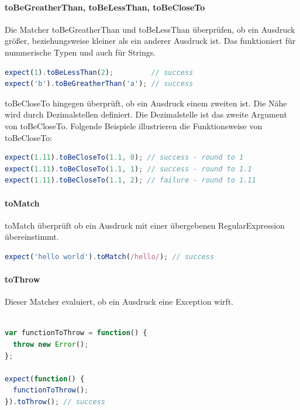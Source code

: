 \paragraph{toBeGreatherThan, toBeLessThan, toBeCloseTo}
Die Matcher toBeGreatherThan und toBeLessThan überprüfen, ob ein Ausdruck größer, beziehungsweise kleiner als ein anderer Ausdruck ist. Das funktioniert für nummerische Typen und auch für Strings.

\begin{lstlisting}[language=JavaScript]
expect(1).toBeLessThan(2);         // success
expect('b').toBeGreatherThan('a'); // success
\end{lstlisting}

toBeCloseTo hingegen überprüft, ob ein Ausdruck  einem zweiten ist. Die Nähe wird durch Dezimalstellen definiert. Die Dezimalstelle ist das zweite Argument von toBeCloseTo. Folgende Beispiele illustrieren die Funktionsweise von toBeCloseTo:

\begin{lstlisting}[language=JavaScript]
expect(1.11).toBeCloseTo(1.1, 0); // success - round to 1
expect(1.11).toBeCloseTo(1.1, 1); // success - round to 1.1
expect(1.11).toBeCloseTo(1.1, 2); // failure - round to 1.11
\end{lstlisting}

\paragraph{toMatch}
toMatch überprüft ob ein Ausdruck mit einer übergebenen RegularExpression übereinstimmt.

\begin{lstlisting}[language=JavaScript]
expect('hello world').toMatch(/hello/); // success
\end{lstlisting}

\paragraph{toThrow}
Dieser Matcher evaluiert, ob ein Ausdruck eine Exception wirft.

\begin{lstlisting}[language=JavaScript]

var functionToThrow = function() {
  throw new Error();
};

expect(function() {
  functionToThrow();
}).toThrow(); // success
\end{lstlisting}


